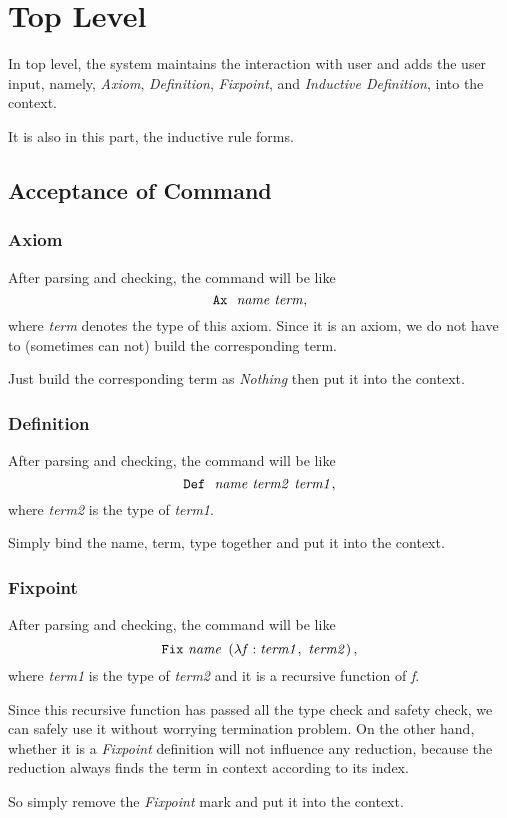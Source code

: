 \section{Top Level}

In top level, the system maintains the interaction with user and
adds the user input, namely, \textit{Axiom}, \textit{Definition}, \textit{Fixpoint}, and \textit{Inductive Definition}, 
into the context.\par
It is also in this part, the inductive rule forms.

\subsection{Acceptance of Command}
\subsubsection{Axiom}
After parsing and checking, the command will be like
$$
\tt Ax\ \ \it name\ term,
$$ 
where {\it term} denotes the type of this axiom.
Since it is an axiom, we do not have to (sometimes can not) build the corresponding term.\par
Just build the corresponding term as {\it Nothing} then put it into the context.

\subsubsection{Definition}
After parsing and checking, the command will be like
$$
\tt Def\ \ {\it name\ term2\ term1},
$$
where {\it term2} is the type of {\it term1}.\par
Simply bind the name, term, type together and put it into the context.

\subsubsection{Fixpoint}
After parsing and checking, the command will be like
$$
\tt Fix\ {\it name }\ \left(\lambda {\it f}:{\it term1},\ {\it term2}\right),
$$
where {\it term1} is the type of {\it term2} and it is a recursive function of {\it f}.\par 
Since this recursive function has passed all the type check and safety check, we can safely use it without worrying termination
problem.
On the other hand, whether it is a {\it Fixpoint} definition will not influence any reduction, because the reduction
always finds the term in context according to its index.\par
So simply remove the {\it Fixpoint} mark and put it into the context.

